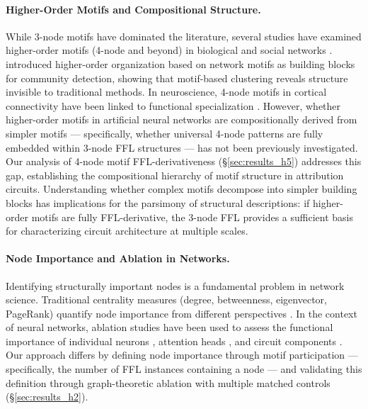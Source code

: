 \paragraph{Higher-Order Motifs and Compositional Structure.}
While 3-node motifs have dominated the literature, several studies have examined higher-order motifs (4-node and beyond) in biological and social networks \cite{milo2004superfamilies}. \citet{benson2016higher} introduced higher-order organization based on network motifs as building blocks for community detection, showing that motif-based clustering reveals structure invisible to traditional methods. In neuroscience, 4-node motifs in cortical connectivity have been linked to functional specialization \cite{sporns2004motifs}. However, whether higher-order motifs in artificial neural networks are compositionally derived from simpler motifs --- specifically, whether universal 4-node patterns are fully embedded within 3-node FFL structures --- has not been previously investigated. Our analysis of 4-node motif FFL-derivativeness (\S\ref{sec:results_h5}) addresses this gap, establishing the compositional hierarchy of motif structure in attribution circuits. Understanding whether complex motifs decompose into simpler building blocks has implications for the parsimony of structural descriptions: if higher-order motifs are fully FFL-derivative, the 3-node FFL provides a sufficient basis for characterizing circuit architecture at multiple scales.

\paragraph{Node Importance and Ablation in Networks.}
Identifying structurally important nodes is a fundamental problem in network science. Traditional centrality measures (degree, betweenness, eigenvector, PageRank) quantify node importance from different perspectives \cite{freeman1978centrality, bonacich1987power}. In the context of neural networks, ablation studies have been used to assess the functional importance of individual neurons \cite{morcos2018importance}, attention heads \cite{voita2019analyzing, michel2019sixteen}, and circuit components \cite{wang2023interpretability}. Our approach differs by defining node importance through motif participation --- specifically, the number of FFL instances containing a node --- and validating this definition through graph-theoretic ablation with multiple matched controls (\S\ref{sec:results_h2}).